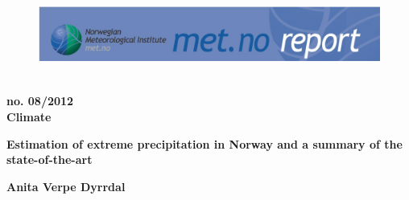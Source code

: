 \documentclass[12pt,a4paper,english]{article}
\begin{document}


\thispagestyle{empty}

\begin{figure}[!ht]
\begin{center}
\includegraphics*[height=29.6mm,width=183mm]{Figs/Topp_report.png}
\end{center}
\end{figure}

\begin{flushright}
{\bf {} no. 08/2012 \\ Climate}
\end{flushright}

\vspace{8mm}

\begin{center}

{\LARGE \bf Estimation of extreme precipitation in Norway and a summary of the state-of-the-art}

\vspace{6mm}

{\large \bf Anita Verpe Dyrrdal}

\end{center}

\vspace{10mm}

\begin{figure}[htbp]
\begin{center}
\end{center}\end{figure}


\clearpage
\newpage

\thispagestyle{empty}

\selectfont

% 
\end{document}
